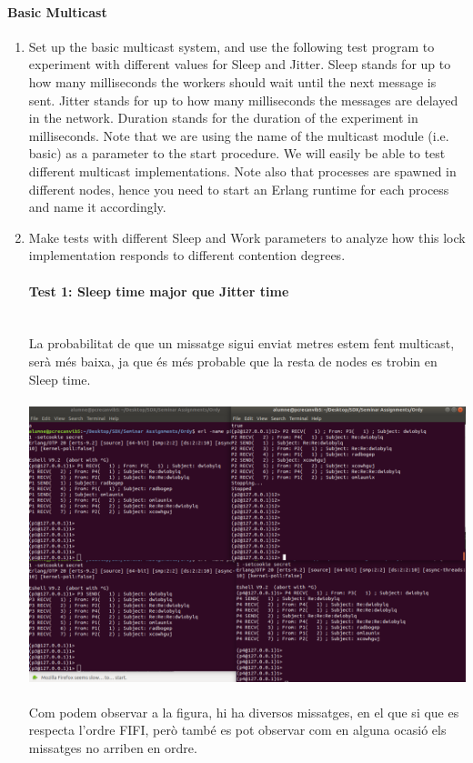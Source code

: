 \documentclass[a4paper, 10pt]{article}
\begin{document}
\paragraph[bold]{Basic Multicast}
\begin{enumerate}
\item Set up the basic multicast system, and use the following test program to experiment with different values for Sleep and Jitter. Sleep stands for up to how many milliseconds the workers should wait until the next message is sent. Jitter stands for up to how many milliseconds the messages are delayed in the network. Duration stands for the duration of the experiment in milliseconds. Note that we are using the name of the multicast module (i.e. basic) as a parameter to the start procedure. We will easily be able to test different multicast implementations. Note also that processes are spawned in different nodes, hence you need to start an Erlang runtime for each process and name it accordingly.\\
\item Make tests with different Sleep and Work parameters to analyze how this lock implementation responds to different contention degrees.
\paragraph[bold]{Test 1: Sleep time major que Jitter time\\\\}
La probabilitat de que un missatge sigui enviat metres estem fent multicast, serà més baixa, ja que és més probable que la resta de nodes es trobin en Sleep time.\\\\
\includegraphics[width=\textwidth]{ordy-basic-1}
\\\\Com podem observar a la figura, hi ha diversos missatges, en el que si que es respecta l'ordre FIFI, però també es pot observar com en alguna ocasió els missatges no arriben en ordre.


\end{enumerate}
\end{document}
